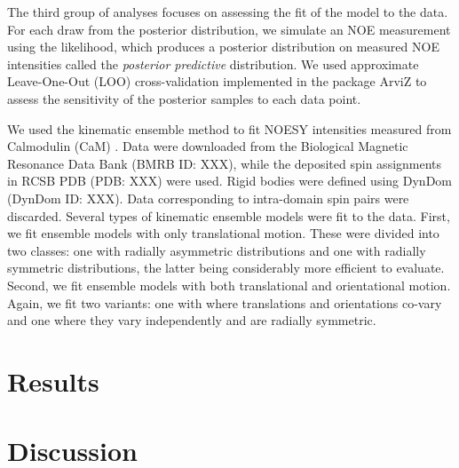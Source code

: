 \documentclass[../main.tex]{subfiles}
\begin{document}
\begin{refsection}
The third group of analyses focuses on assessing the fit of the model to the data.
For each draw from the posterior distribution, we simulate an NOE measurement using the likelihood, which produces a posterior distribution on measured NOE intensities called the \emph{posterior predictive} distribution.
We used approximate Leave-One-Out (LOO) cross-validation \cite{vehtari_practical_2017,vehtari_pareto_2019} implemented in the package ArviZ \cite{kumar_arviz_2019} to assess the sensitivity of the posterior samples to each data point.

We used the kinematic ensemble method to fit NOESY intensities measured from Calmodulin (CaM) \cite{REF}. 
Data were downloaded from the Biological Magnetic Resonance Data Bank (BMRB ID: XXX), while the deposited spin assignments in RCSB PDB (PDB: XXX) were used.
Rigid bodies were defined using DynDom \cite{lee_dyndom_2003,qi_comprehensive_2005} (DynDom ID: XXX).
Data corresponding to intra-domain spin pairs were discarded.
Several types of kinematic ensemble models were fit to the data.
First, we fit ensemble models with only translational motion.
These were divided into two classes: one with radially asymmetric distributions and one with radially symmetric distributions, the latter being considerably more efficient to evaluate.
Second, we fit ensemble models with both translational and orientational motion.
Again, we fit two variants: one with where translations and orientations co-vary and one where they vary independently and are radially symmetric.

\section{Results}\label{results}

\section{Discussion}\label{discussion}

\printbibliography[heading=subbibintoc]
\end{refsection}
\end{document}
